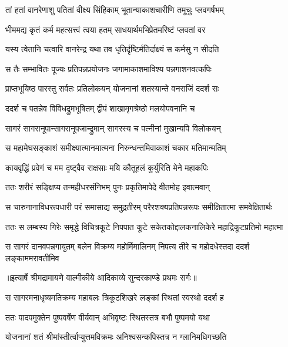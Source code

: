 \twolineshloka
{तां हतां वानरेणाशु पतितां वीक्ष्य सिंहिकाम्}
{भूतान्याकाशचारीणि तमूचुः प्लवगर्षभम्} %

\twolineshloka
{भीममद्य कृतं कर्म महत्सत्त्वं त्वया हतम्}
{साधयार्थमभिप्रेतमरिष्टं प्लवतां वर} %

\twolineshloka
{यस्य त्वेतानि चत्वारि वानरेन्द्र यथा तव}
{धृतिर्दृष्टिर्मतिर्दाक्ष्यं स कर्मसु न सीदति} %

\twolineshloka
{स तैः सम्भावितः पूज्यः प्रतिपन्नप्रयोजनः}
{जगामाकाशमाविश्य पन्नगाशनवत्कपिः} %

\twolineshloka
{प्राप्तभूयिष्ठ पारस्तु सर्वतः प्रतिलोकयन्}
{योजनानां शतस्यान्ते वनराजिं ददर्श सः} %

\twolineshloka
{ददर्श च पतन्नेव विविधद्रुमभूषितम्}
{द्वीपं शाखामृगश्रेष्ठो मलयोपवनानि च} %

\twolineshloka
{सागरं सागरानूपान्सागरानूपजान्द्रुमान्}
{सागरस्य च पत्नीनां मुखान्यपि विलोकयन्} %

\twolineshloka
{स महामेघसङ्काशं समीक्ष्यात्मानमात्मना}
{निरुन्धन्तमिवाकाशं चकार मतिमान्मतिम्} %

\twolineshloka
{कायवृद्धिं प्रवेगं च मम दृष्ट्वैव राक्षसाः}
{मयि कौतूहलं कुर्युरिति मेने महाकपिः} %

\twolineshloka
{ततः शरीरं सङ्क्षिप्य तन्महीधरसंनिभम्}
{पुनः प्रकृतिमापेदे वीतमोह इवात्मवान्} %

\fourlineindentedshloka
{स चारुनानाविधरूपधारी}
{परं समासाद्य समुद्रतीरम्}
{परैरशक्यप्रतिपन्नरूपः}
{समीक्षितात्मा समवेक्षितार्थः} %

\fourlineindentedshloka
{ततः स लम्बस्य गिरेः समृद्धे}
{विचित्रकूटे निपपात कूटे}
{सकेतकोद्दालकनालिकेरे}
{महाद्रिकूटप्रतिमो महात्मा} %

\fourlineindentedshloka
{स सागरं दानवपन्नगायुतम्}
{बलेन विक्रम्य महोर्मिमालिनम्}
{निपत्य तीरे च महोदधेस्तदा}
{ददर्श लङ्काममरावतीमिव} %


{॥इत्यार्षे श्रीमद्रामायणे वाल्मीकीये आदिकाव्ये सुन्दरकाण्डे प्रथमः सर्गः॥}


\twolineshloka
{स सागरमनाधृष्यमतिक्रम्य महाबलः}
{त्रिकूटशिखरे लङ्कां स्थितां स्वस्थो ददर्श ह} %

\twolineshloka
{ततः पादपमुक्तेन पुष्पवर्षेण वीर्यवान्}
{अभिवृष्टः स्थितस्तत्र बभौ पुष्पमयो यथा} %

\twolineshloka
{योजनानां शतं श्रीमांस्तीर्त्वाप्युत्तमविक्रमः}
{अनिश्वसन्कपिस्तत्र न ग्लानिमधिगच्छति} %

